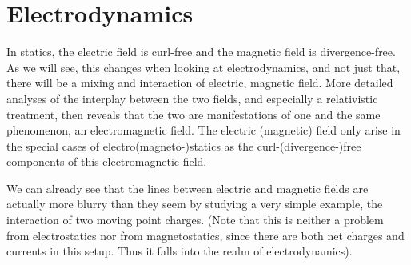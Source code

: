 \documentclass[../class_mech_main.tex]{subfiles}
\begin{document}
    \section{Electrodynamics}
In statics, the electric field is curl-free and the magnetic field is divergence-free. As we will see, this changes when looking at electrodynamics, and not just that, there will be a mixing and interaction of electric, magnetic field. More detailed analyses of the interplay between the two fields, and especially a relativistic treatment, then reveals that the two are manifestations of one and the same phenomenon, an electromagnetic field. The electric (magnetic) field only arise in the special cases of electro(magneto-)statics as the curl-(divergence-)free components of this electromagnetic field.


We can already see that the lines between electric and magnetic fields are actually more blurry than they seem by studying a very simple example, the interaction of two moving point charges. (Note that this is neither a problem from electrostatics nor from magnetostatics, since there are both net charges and currents in this setup. Thus it falls into the realm of electrodynamics).




\end{document}
